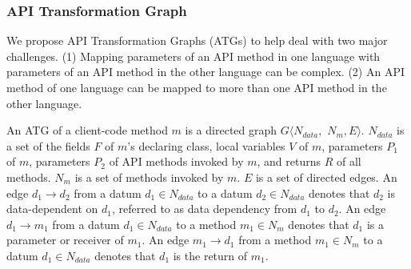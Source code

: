 \subsubsection{API Transformation Graph}
\label{sec:approach:mappingmethods:graph}
We propose API Transformation Graphs (ATGs) to help deal with two
major challenges. (1) Mapping parameters of an API method in one language with
parameters of an API method in the other language can be complex. (2) An API
method of one language can be mapped to more than one API method in the
other language.

An ATG of a client-code method $m$ is a directed graph $G\langle N_{data},$ $ N_m, E\rangle$.
$N_{data}$ is a set of the fields $F$ of $m$'s declaring class, local variables $V$ of
$m$, parameters $P_1$ of $m$, parameters $P_2$ of API methods invoked
by $m$, and returns $R$ of all methods. $N_{m}$ is a set of
methods invoked by $m$. $E$ is a set of directed edges. An edge
$d_1\rightarrow d_2$ from a datum $d_1 \in N_{data}$ to a datum $d_2
\in N_{data}$ denotes that $d_2$ is data-dependent on $d_1$, referred to as
data dependency from $d_1$ to $d_2$. An edge $d_1 \rightarrow m_1$ from a datum $d_1 \in N_{data}$ to a
method $ m_1 \in N_{m}$ denotes that $d_1$ is a parameter or receiver
of $m_1$. An edge $m_1 \rightarrow d_1$ from a method $m_1
\in N_{m}$ to a datum $d_1 \in N_{data}$ denotes that $d_1$ is the return
of $m_1$.

%
%
%


